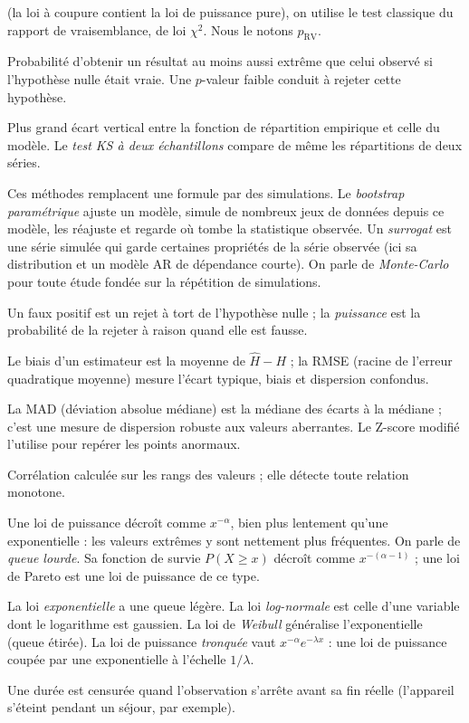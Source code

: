 \documentclass[11pt,a4paper]{article}
\renewcommand{\_}{\textunderscore\penalty0\hspace{0pt}}
\begin{document}
\begin{description}[style=nextline,leftmargin=1.2em,itemsep=4pt]
(la loi à coupure contient la loi de puissance pure), on utilise le test classique du
rapport de vraisemblance, de loi $\chi^2$. Nous le notons $p_{\mathrm{RV}}$.
\item[$p$-valeur.] Probabilité d'obtenir un résultat au moins aussi extrême que celui
observé si l'hypothèse nulle était vraie. Une $p$-valeur faible conduit à rejeter cette
hypothèse.
\item[Distance de Kolmogorov--Smirnov (KS).] Plus grand écart vertical entre la fonction de
répartition empirique et celle du modèle. Le \emph{test KS à deux échantillons} compare de
même les répartitions de deux séries.
\item[Bootstrap, surrogats, Monte-Carlo.] Ces méthodes remplacent une formule par des
simulations. Le \emph{bootstrap paramétrique} ajuste un modèle, simule de nombreux jeux de
données depuis ce modèle, les réajuste et regarde où tombe la statistique observée. Un
\emph{surrogat} est une série simulée qui garde certaines propriétés de la série observée
(ici sa distribution et un modèle AR de dépendance courte). On parle de \emph{Monte-Carlo}
pour toute étude fondée sur la répétition de simulations.
\item[Faux positif, puissance.] Un faux positif est un rejet à tort de l'hypothèse nulle ;
la \emph{puissance} est la probabilité de la rejeter à raison quand elle est fausse.
\item[Biais, RMSE.] Le biais d'un estimateur est la moyenne de $\hat H-H$ ; la RMSE (racine
de l'erreur quadratique moyenne) mesure l'écart typique, biais et dispersion confondus.
\item[MAD et Z-score modifié.] La MAD (déviation absolue médiane) est la médiane des
écarts à la médiane ; c'est une mesure de dispersion robuste aux valeurs aberrantes. Le
Z-score modifié l'utilise pour repérer les points anormaux.
\item[Corrélation de Spearman $\rho_S$.] Corrélation calculée sur les rangs des valeurs ;
elle détecte toute relation monotone.
\item[Loi de puissance, queue lourde.] Une loi de puissance décroît comme $x^{-\alpha}$,
bien plus lentement qu'une exponentielle : les valeurs extrêmes y sont nettement plus
fréquentes. On parle de \emph{queue lourde}. Sa fonction de survie $P(X\ge x)$ décroît
comme $x^{-(\alpha-1)}$ ; une loi de Pareto est une loi de puissance de ce type.
\item[Lois alternatives.] La loi \emph{exponentielle} a une queue légère. La loi
\emph{log-normale} est celle d'une variable dont le logarithme est gaussien. La loi de
\emph{Weibull} généralise l'exponentielle (queue étirée). La loi de puissance \emph{tronquée}
vaut $x^{-\alpha}e^{-\lambda x}$ : une loi de puissance coupée par une exponentielle à
l'échelle $1/\lambda$.
\item[Censure.] Une durée est censurée quand l'observation s'arrête avant sa fin réelle
(l'appareil s'éteint pendant un séjour, par exemple).
\end{description}
\end{document}
